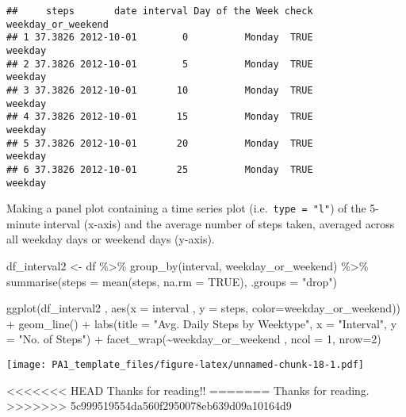 \documentclass[
]{article}
\newenvironment{Shaded}{\begin{snugshade}}{\end{snugshade}}
\newcommand{\AttributeTok}[1]{\textcolor[rgb]{0.77,0.63,0.00}{#1}}
\newcommand{\ConstantTok}[1]{\textcolor[rgb]{0.00,0.00,0.00}{#1}}
\newcommand{\DecValTok}[1]{\textcolor[rgb]{0.00,0.00,0.81}{#1}}
\newcommand{\FunctionTok}[1]{\textcolor[rgb]{0.00,0.00,0.00}{#1}}
\newcommand{\NormalTok}[1]{#1}
\newcommand{\OtherTok}[1]{\textcolor[rgb]{0.56,0.35,0.01}{#1}}
\newcommand{\SpecialCharTok}[1]{\textcolor[rgb]{0.00,0.00,0.00}{#1}}
\newcommand{\StringTok}[1]{\textcolor[rgb]{0.31,0.60,0.02}{#1}}
\begin{document}
\begin{verbatim}
##     steps       date interval Day of the Week check weekday_or_weekend
## 1 37.3826 2012-10-01        0          Monday  TRUE            weekday
## 2 37.3826 2012-10-01        5          Monday  TRUE            weekday
## 3 37.3826 2012-10-01       10          Monday  TRUE            weekday
## 4 37.3826 2012-10-01       15          Monday  TRUE            weekday
## 5 37.3826 2012-10-01       20          Monday  TRUE            weekday
## 6 37.3826 2012-10-01       25          Monday  TRUE            weekday
\end{verbatim}

Making a panel plot containing a time series plot
(i.e.~\texttt{𝚝𝚢𝚙𝚎\ =\ "𝚕"}) of the 5-minute interval (x-axis) and the
average number of steps taken, averaged across all weekday days or
weekend days (y-axis).

\begin{Shaded}
\begin{Highlighting}[]
\NormalTok{df\_interval2 }\OtherTok{\textless{}{-}}\NormalTok{ df }\SpecialCharTok{\%\textgreater{}\%} \FunctionTok{group\_by}\NormalTok{(interval, weekday\_or\_weekend) }\SpecialCharTok{\%\textgreater{}\%} \FunctionTok{summarise}\NormalTok{(}\AttributeTok{steps =} \FunctionTok{mean}\NormalTok{(steps, }\AttributeTok{na.rm =} \ConstantTok{TRUE}\NormalTok{), }\AttributeTok{.groups =} \StringTok{"drop"}\NormalTok{)}

\FunctionTok{ggplot}\NormalTok{(df\_interval2 , }\FunctionTok{aes}\NormalTok{(}\AttributeTok{x =}\NormalTok{ interval , }\AttributeTok{y =}\NormalTok{ steps, }\AttributeTok{color=}\NormalTok{weekday\_or\_weekend)) }\SpecialCharTok{+} \FunctionTok{geom\_line}\NormalTok{() }\SpecialCharTok{+} \FunctionTok{labs}\NormalTok{(}\AttributeTok{title =} \StringTok{"Avg. Daily Steps by Weektype"}\NormalTok{, }\AttributeTok{x =} \StringTok{"Interval"}\NormalTok{, }\AttributeTok{y =} \StringTok{"No. of Steps"}\NormalTok{) }\SpecialCharTok{+} \FunctionTok{facet\_wrap}\NormalTok{(}\SpecialCharTok{\textasciitilde{}}\NormalTok{weekday\_or\_weekend , }\AttributeTok{ncol =} \DecValTok{1}\NormalTok{, }\AttributeTok{nrow=}\DecValTok{2}\NormalTok{)}
\end{Highlighting}
\end{Shaded}

\texttt{[image: PA1\_template\_files/figure-latex/unnamed-chunk-18-1.pdf]}

\textless\textless\textless\textless\textless\textless\textless{} HEAD
Thanks for reading!! ======= Thanks for reading.
\textgreater\textgreater\textgreater\textgreater\textgreater\textgreater\textgreater{}
5c999519554da560f2950078eb639d09a10164d9
\end{document}
